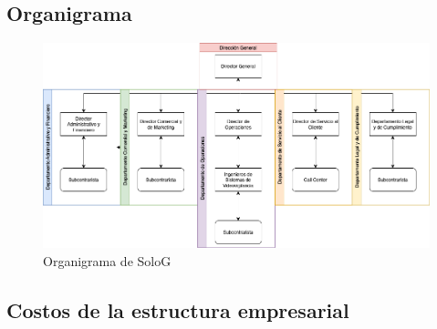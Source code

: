 \documentclass{report}
\begin{document}
          \subsection{Organigrama}
            \begin{figure}[H]
              \centering
              \includegraphics[width=1\textwidth]{./img/organigrama.png}
              \caption{Organigrama de SoloG}
            \end{figure}
          \clearpage\subsection{Costos de la estructura empresarial}
\end{document}
